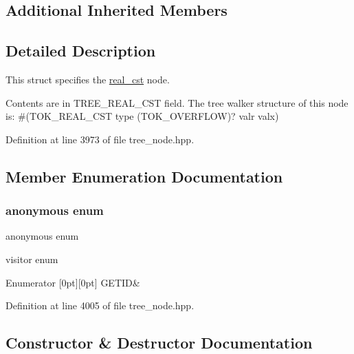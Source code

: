 \subsection*{Additional Inherited Members}


\subsection{Detailed Description}
This struct specifies the \hyperlink{structreal__cst}{real\+\_\+cst} node. 

Contents are in T\+R\+E\+E\+\_\+\+R\+E\+A\+L\+\_\+\+C\+ST field. The tree walker structure of this node is\+: \#(T\+O\+K\+\_\+\+R\+E\+A\+L\+\_\+\+C\+ST type (T\+O\+K\+\_\+\+O\+V\+E\+R\+F\+L\+OW)? valr valx) 

Definition at line 3973 of file tree\+\_\+node.\+hpp.



\subsection{Member Enumeration Documentation}
\mbox{\label{structreal__cst_a300e0077d353566ee30691a50f034a35}} 
\subsubsection{\texorpdfstring{anonymous enum}{anonymous enum}}
{\footnotesize\ttfamily anonymous enum}



visitor enum 

\begin{DoxyEnumFields}{Enumerator}
[0pt][0pt]{}\mbox{\label{structreal__cst_a300e0077d353566ee30691a50f034a35ac1078aeee8979b474d4d9806c9f80286}} 
G\+E\+T\+ID&\\
\hline

\end{DoxyEnumFields}


Definition at line 4005 of file tree\+\_\+node.\+hpp.



\subsection{Constructor \& Destructor Documentation}
\mbox{\label{structreal__cst_adf68bd74d76034ba702cec98753d14ad}} 
